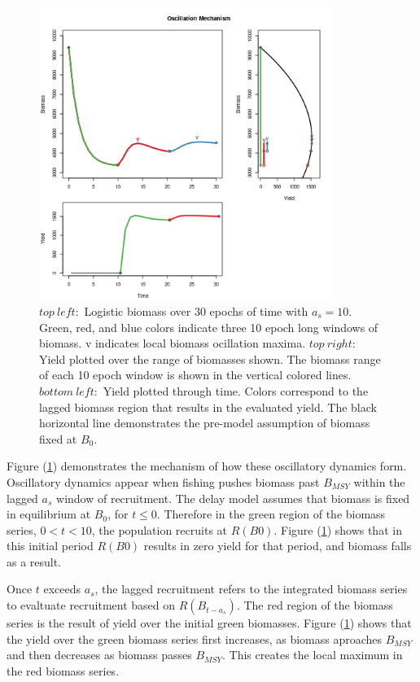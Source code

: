 \begin{figure}[h!]
\centering
\includegraphics[width=0.85\textwidth]{../ddBias/shockBiomassYeild.png}
\vspace{-0.5cm}
\caption{$top~left:$ Logistic biomass over 30 epochs of time with $a_s=10$. 
Green, red, and blue colors indicate three 10 epoch long windows of biomass. 
v indicates local biomass ocillation maxima. 
$top~right:$ Yield plotted over the range of biomasses shown. 
The biomass range of each 10 epoch window is shown in the vertical colored lines.
$bottom~left:$ Yield plotted through time. Colors correspond to the 
lagged biomass region that results in the evaluated yield. The black horizontal 
line demonstrates the pre-model assumption of biomass fixed at $B_0$. 
}
\label{shock}
\end{figure}

%
Figure (\ref{shock}) demonstrates the mechanism of how these oscillatory 
dynamics form. Oscillatory dynamics appear when fishing pushes biomass past 
$B_{MSY}$ within the lagged $a_s$ window of recruitment. The delay model assumes that 
biomass is fixed in equilibrium at $B_0$, for $t\le0$. Therefore in the green region of 
the biomass series, $0<t<10$, the population recruits at $R(B0)$. Figure (\ref{shock}) 
shows that in this initial period $R(B0)$ results in zero yield for that 
period, and biomass falls as a result. 

%
Once $t$ exceeds $a_s$, the lagged recruitment refers to the integrated 
biomass series to evaltuate recruitment based on $R(B_{t-a_s})$. The red 
region of the biomass series is the result of yield over the initial 
green biomasses. Figure (\ref{shock}) shows that the yield over the green biomass 
series first increases, as biomass aproaches $B_{MSY}$ and then decreases as biomass 
passes $B_{MSY}$. This creates the local maximum in the red biomass series.

